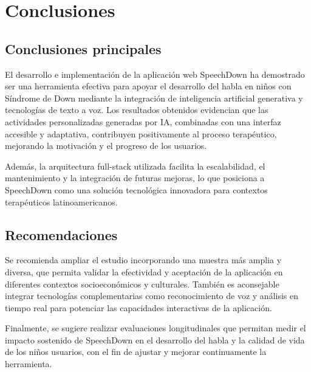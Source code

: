 \chapter{Conclusiones}

\section{Conclusiones principales}
El desarrollo e implementación de la aplicación web SpeechDown ha demostrado ser una herramienta efectiva para apoyar el desarrollo del habla en niños con Síndrome de Down mediante la integración de inteligencia artificial generativa y tecnologías de texto a voz. Los resultados obtenidos evidencian que las actividades personalizadas generadas por IA, combinadas con una interfaz accesible y adaptativa, contribuyen positivamente al proceso terapéutico, mejorando la motivación y el progreso de los usuarios.

Además, la arquitectura full-stack utilizada facilita la escalabilidad, el mantenimiento y la integración de futuras mejoras, lo que posiciona a SpeechDown como una solución tecnológica innovadora para contextos terapéuticos latinoamericanos.

\section{Recomendaciones}
Se recomienda ampliar el estudio incorporando una muestra más amplia y diversa, que permita validar la efectividad y aceptación de la aplicación en diferentes contextos socioeconómicos y culturales. También es aconsejable integrar tecnologías complementarias como reconocimiento de voz y análisis en tiempo real para potenciar las capacidades interactivas de la aplicación.

Finalmente, se sugiere realizar evaluaciones longitudinales que permitan medir el impacto sostenido de SpeechDown en el desarrollo del habla y la calidad de vida de los niños usuarios, con el fin de ajustar y mejorar continuamente la herramienta.
